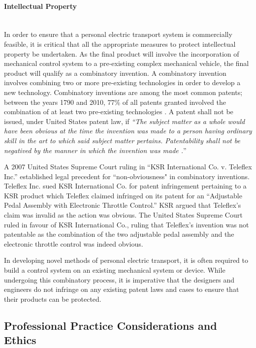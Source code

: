 \paragraph{Intellectual Property}\mbox{}\\
In order to ensure that a personal electric transport system is commercially feasible, it is critical that all the appropriate measures to protect intellectual property be undertaken. 
As the final product will involve the incorporation of mechanical control system to a pre-existing complex mechanical vehicle, the final product will qualify as a combinatory invention. 
A combinatory invention involves combining two or more pre-existing technologies in order to develop a new technology. 
Combinatory inventions are among the most common patents; between the years 1790 and 2010, 77\% of all patents granted involved the combination of at least two pre-existing technologies \cite{comblaw}.
A patent shall not be issued, under United States patent law, if \emph{``The subject matter as a whole would have been obvious at the time the invention was made to a person having ordinary skill in the art to which said subject matter pertains. 
Patentability shall not be negatived by the manner in which the invention was made \cite{NonObv}.}''

A 2007 United States Supreme Court ruling in ``KSR International Co. v. Teleflex Inc.'' established legal precedent for “non-obviousness" in combinatory inventions. 
Teleflex Inc. sued KSR International Co. for patent infringement pertaining to a KSR product which Teleflex claimed infringed on its patent for an ``Adjustable Pedal Assembly with Electronic Throttle Control.''
KSR argued that Teleflex's claim was invalid as the action was obvious. 
The United States Supreme Court ruled in favour of KSR International Co.,  
ruling that Teleflex's invention was not patentable as the combination of the two adjustable pedal assembly and the electronic throttle control was indeed obvious. 

In developing novel methods of personal electric transport, it is often required to build a control system on an existing mechanical system or device. While undergoing this combinatory process, it is imperative that the designers and engineers do not infringe on any existing patent laws and cases to ensure that their products can be protected.


\subsection{Professional Practice Considerations and Ethics}

